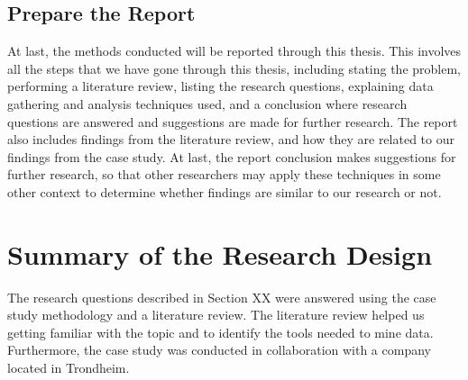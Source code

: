 \subsection{Prepare the Report}
At last, the methods conducted will be reported through this thesis. This involves all the steps that we have gone through this thesis, including stating the problem, performing a literature review, listing the research questions, explaining data gathering and analysis techniques used, and a conclusion where research questions are answered and suggestions are made for further research. The report also includes findings from the literature review, and how they are related to our findings from the case study. At last, the report conclusion makes suggestions for further research, so that other researchers may apply these techniques in some other context to determine whether findings are similar to our research or not.


\section{Summary of the Research Design}
The research questions described in Section XX were answered using the case study methodology and a literature review. The literature review helped us getting familiar with the topic and to identify the tools needed to mine data. Furthermore, the case study was conducted in collaboration with a company located in Trondheim. 


























